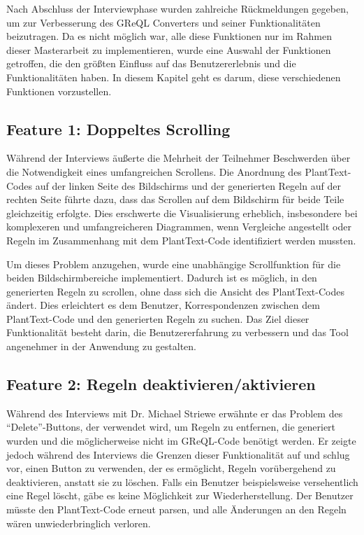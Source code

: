 Nach Abschluss der Interviewphase wurden zahlreiche Rückmeldungen gegeben, um zur Verbesserung des GReQL Converters und
seiner Funktionalitäten beizutragen. Da es nicht möglich war, alle diese Funktionen nur im Rahmen dieser Masterarbeit
zu implementieren, wurde eine Auswahl der Funktionen getroffen, die den größten Einfluss auf das Benutzererlebnis und
die Funktionalitäten haben. In diesem Kapitel geht es darum, diese verschiedenen Funktionen vorzustellen.

\subsection{Feature 1: Doppeltes Scrolling}

Während der Interviews äußerte die Mehrheit der Teilnehmer Beschwerden über die Notwendigkeit eines umfangreichen
Scrollens. Die Anordnung des PlantText-Codes auf der linken Seite des Bildschirms und der generierten Regeln auf der
rechten Seite führte dazu, dass das Scrollen auf dem Bildschirm für beide Teile gleichzeitig erfolgte. Dies erschwerte
die Visualisierung erheblich, insbesondere bei komplexeren und umfangreicheren Diagrammen, wenn Vergleiche angestellt
oder Regeln im Zusammenhang mit dem PlantText-Code identifiziert werden mussten.

Um dieses Problem anzugehen, wurde eine unabhängige Scrollfunktion für die beiden Bildschirmbereiche implementiert.
Dadurch ist es möglich, in den generierten Regeln zu scrollen, ohne dass sich die Ansicht des PlantText-Codes ändert.
Dies erleichtert es dem Benutzer, Korrespondenzen zwischen dem PlantText-Code und den generierten Regeln zu suchen. Das
Ziel dieser Funktionalität besteht darin, die Benutzererfahrung zu verbessern und das Tool angenehmer in der Anwendung
zu gestalten.

\subsection{Feature 2: Regeln deaktivieren/aktivieren}

Während des Interviews mit Dr. Michael Striewe erwähnte er das Problem des ``Delete''-Buttons, der verwendet wird, um
Regeln zu entfernen, die generiert wurden und die möglicherweise nicht im GReQL-Code benötigt werden. Er zeigte jedoch
während des Interviews die Grenzen dieser Funktionalität auf und schlug vor, einen Button zu verwenden, der es
ermöglicht, Regeln vorübergehend zu deaktivieren, anstatt sie zu löschen. Falls ein Benutzer beispielsweise
versehentlich eine Regel löscht, gäbe es keine Möglichkeit zur Wiederherstellung. Der Benutzer müsste den PlantText-Code
erneut parsen, und alle Änderungen an den Regeln wären unwiederbringlich verloren.

